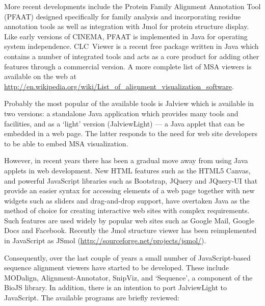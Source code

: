 \documentclass[a4]{article}
\begin{document}
More recent developments include the Protein Family Alignment
Annotation Tool (PFAAT)\cite{johnson:pfaat} designed specifically for
family analysis and incorporating residue annotation tools as well as
integration with Jmol for protein structure display. Like early
versions of CINEMA, PFAAT is implemented in Java for operating system
independence. CLC~Viewer is a recent free package written in Java
which contains a number of integrated tools and acts as a core product
for adding other features through a commercial version.  A more
complete list of MSA viewers is available on the web at
\url{http://en.wikipedia.org/wiki/List_of_alignment_visualization_software}.

Probably the most popular of the available tools is
Jalview\cite{clamp:jalview} which is available in two versions: a
standalone Java application which provides many tools and facilities,
and as a `light' version (JalviewLight) --- a Java applet that can be
embedded in a web page. The latter responds to the need for web site
developers to be able to embed MSA visualization.

However, in recent years there has been a gradual move away from using
Java applets in web development. New HTML features such as the HTML5
Canvas, and powerful JavaScript libraries such as Bootstrap, JQuery
and JQuery-UI that provide an easier syntax for accessing elements of
a web page together with new widgets such as sliders and drag-and-drop
support, have overtaken Java as the method of choice for creating
interactive web sites with complex requirements.  Such features are
used widely by popular web sites such as Google Mail, Google Docs and
Facebook.  Recently the Jmol structure viewer has been reimplemented
in JavaScript as JSmol (\url{http://sourceforge.net/projects/jsmol/}).

Consequently, over the last couple of years a small number of
JavaScript-based sequence alignment viewers have started to be
developed. These include MODalign\cite{barbato:modalign},
Alignment-Annotator\cite{gille:2014aa}, SnipViz\cite{jaschob:2014},
and `Sequence'\cite{gomez:2014}, a component of the BioJS
library\cite{corpas:biojs}. In addition, there is an intention to port
JalviewLight to JavaScript.  The available programs are briefly
reviewed:
\end{document}
